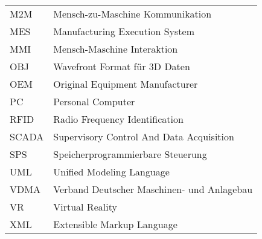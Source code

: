 \begin{tabular}{l l}
		M2M		&	Mensch-zu-Maschine Kommunikation \\
		MES 	&  	Manufacturing Execution System \\
		MMI 	&  	Mensch-Maschine Interaktion \\
		OBJ		&	Wavefront Format für 3D Daten \\
		OEM 	& 	Original Equipment Manufacturer \\
		PC		&	Personal Computer \\
		RFID	&	Radio Frequency Identification \\
		SCADA	&	Supervisory Control And Data Acquisition \\
		SPS		&	Speicherprogrammierbare Steuerung\\
		UML		&	Unified Modeling Language \\
		VDMA	&	Verband Deutscher Maschinen- und Anlagebau \\
		VR 		& 	Virtual Reality \\
		XML		&	Extensible Markup Language \\
\end{tabular} 

